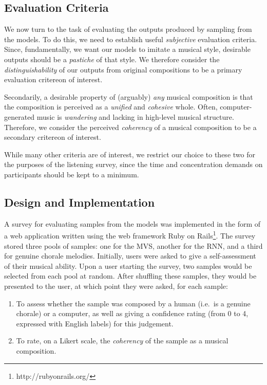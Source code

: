 \documentclass[12pt,a4paper,twoside,openright]{report}
\begin{document}
\subsection{Evaluation Criteria}

We now turn to the task of evaluating the outputs produced by sampling from the
models. To do this, we need to establish useful \emph{subjective} evaluation
criteria. Since, fundamentally, we want our models to imitate a musical style,
desirable outputs should be a \emph{pastiche} of that style. We
therefore consider the \emph{distinguishability} of our outputs from original
compositions to be a primary evaluation critereon of interest.

Secondarily, a desirable property of (arguably) \emph{any} musical composition
is that the composition is perceived as a \emph{unified} and \emph{cohesive}
whole. Often, computer-generated music is \emph{wandering} and lacking
in high-level musical structure. Therefore, we consider the perceived
\emph{coherency} of a musical composition to be a secondary critereon of
interest.

While many other criteria are of interest, we restrict our choice to these two
for the purposes of the listening survey, since the time and concentration
demands on participants should be kept to a minimum.

\subsection{Design and Implementation}

A survey for evaluating samples from the models was implemented in the form of a
web application written using the web framework Ruby on
Rails\footnote{http://rubyonrails.org/}.  The survey stored three pools of
samples: one for the MVS, another for the RNN, and a third for genuine chorale
melodies. Initially, users were asked to give a self-assessment of their musical
ability. Upon a user starting the survey, two samples would be selected from
each pool at random.  After shuffling these samples, they would be presented to
the user, at which point they were asked, for each sample:
\begin{enumerate}[label=\arabic*., itemsep=0mm]
  \item To assess whether the sample was composed by a human (i.e.\ is a genuine
    chorale) or a computer, as well as giving a confidence rating (from 0 to 4,
    expressed with English labels) for this judgement.
  \item To rate, on a Likert scale, the \emph{coherency} of the sample as a
    musical composition.
\end{enumerate}
\end{document}
